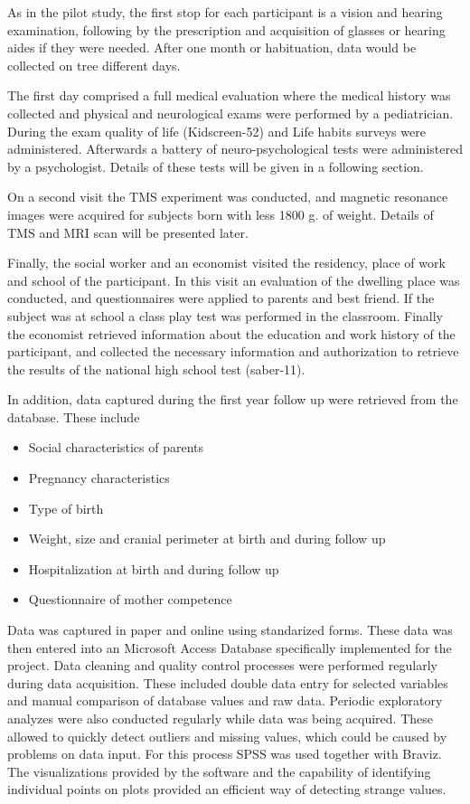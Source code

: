  
As in the pilot study, the first stop for each participant is a vision and hearing examination, following by the prescription and acquisition of glasses or hearing aides if they were needed. After one month or habituation, data would be collected on tree different days.

The first day comprised a full medical evaluation where the medical history was collected and physical and neurological exams were performed by a pediatrician. During the exam quality of life (Kidscreen-52) and Life habits surveys were administered. Afterwards a battery of neuro-psychological tests were administered by a psychologist. Details of these tests will be given in a following section. 

On a second visit the TMS experiment was conducted, and magnetic resonance images were acquired for subjects born with less 1800 g. of weight. Details of TMS and MRI scan will be presented later.

Finally, the social worker and an economist visited the residency, place of work and school of the participant. In this visit an evaluation of the dwelling place was conducted, and questionnaires were applied to parents and best friend. If the subject was at school a class play test was performed in the classroom. Finally the economist retrieved information about the education and work history of the participant, and collected the necessary information and authorization to retrieve the results of the national high school test (saber-11).

In addition, data captured during the first year follow up were retrieved from the database. These include

\begin{itemize}
\item Social characteristics of parents
\item Pregnancy characteristics 
\item Type of birth
\item Weight, size and cranial perimeter at birth and during follow up
\item Hospitalization at birth and during follow up
\item Questionnaire of mother competence
\end{itemize}

Data was captured in paper and online using standarized forms. These data was then entered into an Microsoft Access Database specifically implemented for the project. Data cleaning and quality control processes were performed regularly during data acquisition. These included double data entry for selected variables and manual comparison of database values and raw data. Periodic exploratory analyzes were also conducted regularly while data was being acquired. These allowed to quickly detect outliers and missing values, which could be caused by problems on data input. For this process SPSS was used together with Braviz. The visualizations provided by the software and the capability of identifying individual points on plots provided an efficient way of detecting strange values.

